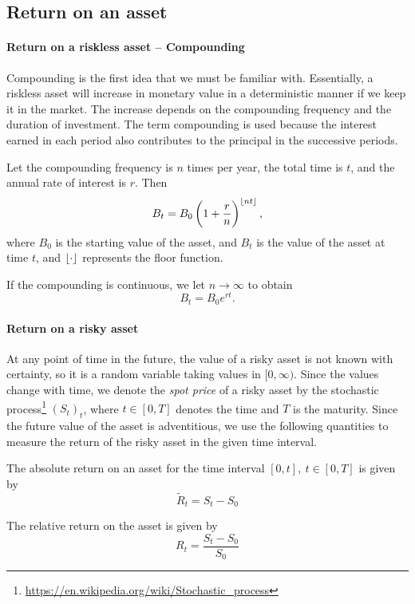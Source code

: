 \subsection{Return on an asset}
\label{subsec:intro-assets-return}

\paragraph{Return on a riskless asset -- Compounding}
Compounding is the first idea that we must be familiar with. Essentially, a riskless asset will increase in monetary value in a deterministic manner if we keep it in the market. The increase depends on the compounding frequency and the duration of investment. The term compounding is used because the interest earned in each period also contributes to the principal in the successive periods.

Let the compounding frequency is $ n $ times per year, the total time is $ t $, and the annual rate of interest is $ r $. Then
\begin{equation}
	\label{eq:intro-compounding-discrete}
	B_t = B_0 \left(1 + \frac{r}{n} \right)^{\left\lfloor nt\right\rfloor},
\end{equation}
where $ B_0 $ is the starting value of the asset, and $ B_t $ is the value of the asset at time $ t $, and $ \left\lfloor\cdot\right\rfloor $ represents the floor function.

If the compounding is continuous, we let $ n \to \infty $ to obtain
\begin{equation}
	\label{eq:intro-compounding-continous}
	B_t = B_0 e^{rt}.
\end{equation}


\paragraph{Return on a risky asset}
At any point of time in the future, the value of a risky asset is not known with certainty, so it is a random variable taking values in $ [0, \infty) $. Since the values change with time, we denote the \emph{spot price} of a risky asset by the stochastic process\footnote{\url{https://en.wikipedia.org/wiki/Stochastic_process}} $ (S_t)_t $, where $ t \in [0, T] $ denotes the time and $ T $ is the maturity. Since the future value of the asset is adventitious, we use the following quantities to measure the return of the risky asset in the given time interval.

\begin{dfn}
	The absolute return on an asset for the time interval $ [0, t], \  t \in [0, T] $ is given by
	\begin{equation*}
		\tilde{R}_t = S_t - S_0
	\end{equation*}
	
	The relative return on the asset is given by
	\begin{equation*}
		R_t = \frac{S_t - S_0}{S_0}
	\end{equation*}	
\end{dfn}

